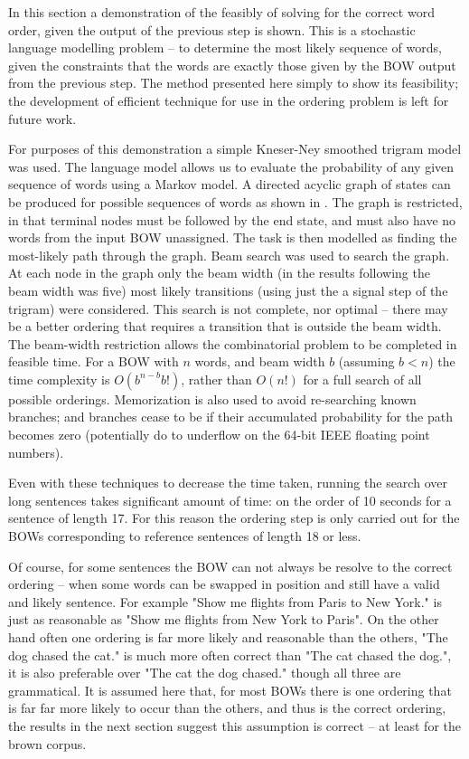 \documentclass[11pt]{article}
\numberwithin{equation}{section}
\numberwithin{figure}{section}
\theoremstyle{plain}
\theoremstyle{definition}
\begin{document}
In this section a demonstration of the feasibly of solving for the correct word order, given the output of the previous step is shown. This is a stochastic language modelling problem -- to determine the most likely sequence of words, given the constraints that the words are exactly those given by the BOW output from the previous step. The method presented here simply to show its feasibility; the development of efficient technique for use in the ordering problem is left for future work.


For purposes of this demonstration a simple Kneser-Ney smoothed trigram model \parencite{kneser1995improved} was used. The language model allows us to evaluate the probability of any given sequence of words using a Markov model.
A directed acyclic graph of states can be produced for possible sequences of words as shown in . The graph is restricted, in that terminal nodes must be followed by the end state, and must also have no words from the input BOW unassigned. The task is then modelled as finding the most-likely path through the graph.
Beam search was used to search the graph. At each node in the graph only the beam width (in the results following the beam width was five) most likely transitions (using just the a signal step of the trigram) were considered. This search is not complete, nor optimal -- there may be a better ordering that requires a transition that is outside the beam width. The beam-width restriction allows the combinatorial problem to be completed in feasible time. For a BOW with $n$ words, and beam width $b$ (assuming $b<n$) the time complexity is $O(b^{n-b}b!)$, rather than $O(n!)$ for a full search of all possible orderings. Memorization is also used to avoid re-searching known branches; and branches cease to be  if their accumulated probability for the path becomes zero (potentially do to underflow on the 64-bit IEEE floating point numbers).

Even with these techniques to decrease the time taken, running the search over long sentences takes significant amount of time: on the order of 10 seconds for a sentence of length 17. For this reason the ordering step is only carried out for the BOWs corresponding to reference sentences of length 18 or less. 
 
 
Of course, for some sentences the BOW can not always be resolve to the correct ordering -- when some words can be swapped in position and still have a valid and likely sentence. For example "Show me flights from Paris to New York." is just as reasonable as  "Show me flights from New York to Paris". On the other hand often one ordering is far more likely and reasonable than the others, "The dog chased the cat." is much more often correct than "The cat chased the dog.", it is also preferable over "The cat the dog chased." though all three are grammatical. It is assumed here that, for most BOWs there is one ordering that is far far more likely to occur than the others, and thus is the correct ordering, the results in the next section suggest this assumption is correct -- at least for the brown corpus. 
\end{document}
